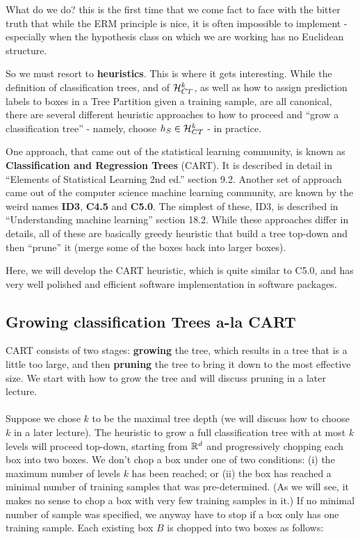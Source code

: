    What do we do? this is the first time that we come fact to face with the
   bitter truth that while the ERM principle is nice, it is often impossible to
   implement - especially when the hypothesis class on which we are working has
   no Euclidean structure. 

   So we must resort to {\bf heuristics}. This is where it gets interesting.
   While the definition of classification trees,  and of $\mathcal{H}^k_{CT}$, as well
   as how to assign prediction labels to boxes in a Tree Partition  given a
   training sample, are all canonical, there are several different heuristic
   approaches to how to proceed and ``grow a classification tree'' - namely,
   choose $h_S\in \mathcal{H}^k_{CT}$ - in practice. 

   One approach, that came out of the statistical learning community, is known
   as {\bf Classification and Regression Trees} (CART). It is described in
   detail in ``Elements of Statistical Learning 2nd ed.'' section 9.2. Another
   set of approach came out of the computer science machine learning community,
   are known by the weird names {\bf ID3}, {\bf C4.5} and {\bf C5.0}. The
 simplest of these, ID3, is described in ``Understanding machine learning''
 section 18.2. While these approaches differ in details, all of these are
 basically greedy heuristic that build a tree top-down and then ``prune'' it
 (merge some of the boxes back into larger boxes).

 Here, we will develop the CART heuristic, which is quite similar to C5.0, and has very well
 polished and efficient software implementation in software packages. 

 \subsection{Growing classification Trees a-la CART}

 CART consists of two stages: {\bf growing} the tree, which results in a tree
 that is a little too large, and then {\bf pruning} the tree to bring it down to
 the most effective size. We start with how to grow the tree and will discuss
 pruning in a later lecture. 
\\~\\
Suppose we chose $k$ to be the maximal tree depth (we will discuss how to choose
$k$ in a later lecture). The heuristic to grow a full classification
tree with at most $k$ levels will proceed top-down, starting from $\mathbb{R}^d$ and
progressively chopping each box into two boxes. We don't chop a box under one of
two conditions: (i) the maximum number of levels $k$ has been reached; or (ii)
the box has reached a minimal number of training samples that was
pre-determined. (As we will see, it makes no sense to chop a box with very few
training samples in it.) If no minimal number of sample was specified, we anyway
have to stop if a box only has one training sample. 
Each existing box $B$ is chopped into two
boxes as follows:


